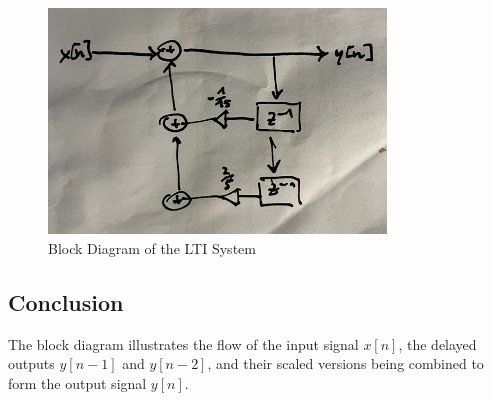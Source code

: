 \begin{figure}[h]
    \centering
    \includegraphics[width=0.8\textwidth]{fig/ex2_a_block_diagram.png}
    \caption{Block Diagram of the LTI System}
    \label{fig:ex2_a_block_diagram}
\end{figure}

\subsection*{Conclusion}
The block diagram illustrates the flow of the input signal \( x[n] \), the delayed outputs \( y[n-1] \) and \( y[n-2] \), and their scaled versions being combined to form the output signal \( y[n] \).
